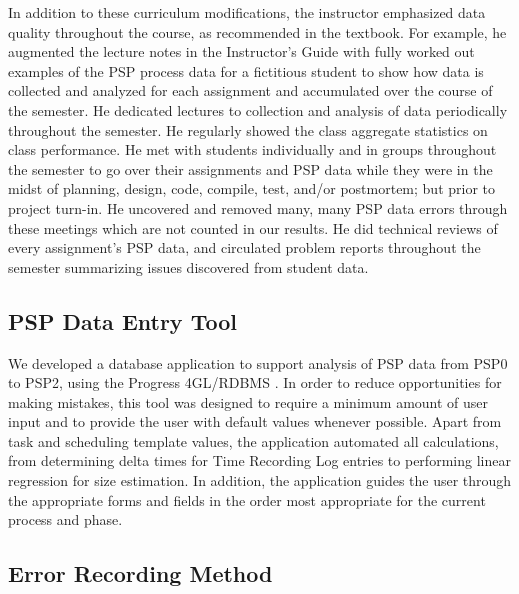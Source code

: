   In addition to these curriculum modifications, the instructor
  emphasized data quality throughout the course, as recommended in the
  textbook.  For example, he augmented the lecture notes in the
  Instructor's Guide with fully worked out examples of the PSP process data
  for a fictitious student to show how data is collected and analyzed for
  each assignment and accumulated over the course of the semester.  He
  dedicated lectures to collection and analysis of data periodically
  throughout the semester. He regularly showed the class aggregate
  statistics on class performance.  He met with students individually and
  in groups throughout the semester to go over their assignments and PSP
  data while they were in the midst of planning, design, code, compile,
  test, and/or postmortem; but prior to project turn-in.  He uncovered and
  removed many, many PSP data errors through these meetings which are not
  counted in our results.  He did technical reviews of every assignment's
  PSP data, and circulated problem reports throughout the semester
  summarizing issues discovered from student data.

  \subsection{PSP Data Entry Tool}
  
  We developed a database application to support analysis of PSP data from
  PSP0 to PSP2, using the Progress 4GL/RDBMS \cite{Progress98}.  In order
  to reduce opportunities for making mistakes, this tool was designed to
  require a minimum amount of user input and to provide the user with
  default values whenever possible.  Apart from task and scheduling template 
  values, the application automated all calculations, from determining delta 
  times for Time Recording Log entries to performing linear regression for 
  size estimation. In addition, the application guides the user through the
  appropriate forms and fields in the order most appropriate for the
  current process and phase.
 
  \subsection{Error Recording Method}
  
